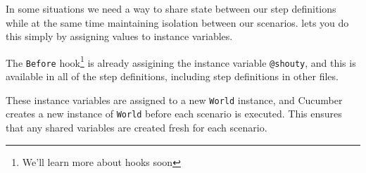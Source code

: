 In some situations we need a way to share state between our step definitions while at the same time maintaining isolation between our scenarios. \CUKE{} lets you do this simply by assigning values to instance variables.

The \texttt{Before} hook\footnote{We'll learn more about hooks soon} is already assigining the instance variable \texttt{@shouty}, and this is available in all of the step definitions, including step definitions in other files.

These instance variables are assigned to a new \texttt{World} instance, and Cucumber creates a new instance of \texttt{World} before each scenario is executed. This ensures that any shared variables are created fresh for each scenario.
